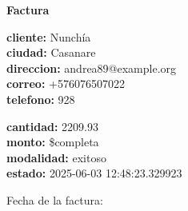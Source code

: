 \documentclass{article}
\begin{document}
\begin{center}
    {\LARGE \textbf{Factura}}\\[1cm]
\end{center}

\textbf{cliente:} Nunchía \\
\textbf{ciudad:} Casanare \\
\textbf{direccion:} andrea89@example.org \\
\textbf{correo:} +576076507022 \\
\textbf{telefono:} 928 \\

\vspace{0.5cm}

\textbf{cantidad:} 2209.93 \\
\textbf{monto:} \$completa \\
\textbf{modalidad:} exitoso \\
\textbf{estado:} 2025-06-03 12:48:23.329923 \\

\vspace{1cm}

Fecha de la factura: 
\end{document}
